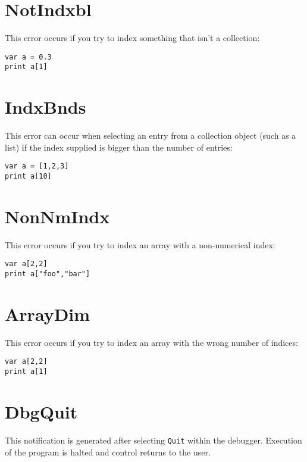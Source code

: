 \hypertarget{notindxbl}{%
\section{NotIndxbl}\label{notindxbl}}

This error occurs if you try to index something that isn't a collection:

\begin{lstlisting}
var a = 0.3
print a[1]
\end{lstlisting}

\hypertarget{indxbnds}{%
\section{IndxBnds}\label{indxbnds}}

This error can occur when selecting an entry from a collection object
(such as a list) if the index supplied is bigger than the number of
entries:

\begin{lstlisting}
var a = [1,2,3]
print a[10]
\end{lstlisting}

\hypertarget{nonnmindx}{%
\section{NonNmIndx}\label{nonnmindx}}

This error occurs if you try to index an array with a non-numerical
index:

\begin{lstlisting}
var a[2,2]
print a["foo","bar"]
\end{lstlisting}

\hypertarget{arraydim}{%
\section{ArrayDim}\label{arraydim}}

This error occurs if you try to index an array with the wrong number of
indices:

\begin{lstlisting}
var a[2,2]
print a[1]
\end{lstlisting}

\hypertarget{dbgquit}{%
\section{DbgQuit}\label{dbgquit}}

This notification is generated after selecting \texttt{Quit} within the
debugger. Execution of the program is halted and control returns to the
user.

